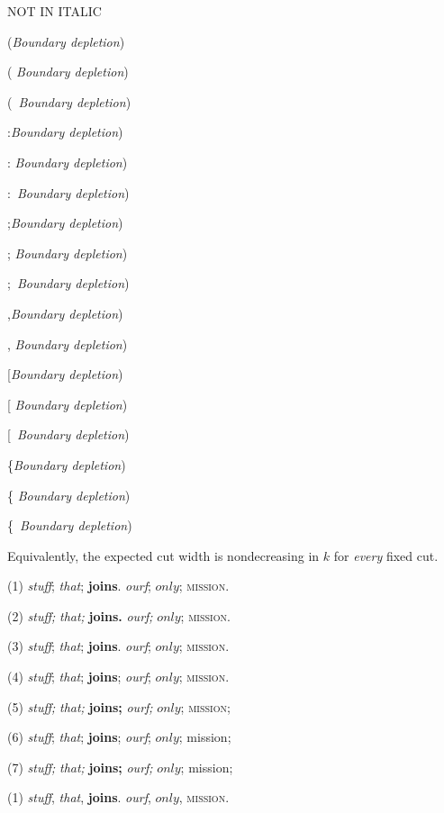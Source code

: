 \documentclass{amsart}
\begin{document}
    \vspace{24pt}

    \textsc{NOT IN ITALIC}

  (\emph{Boundary depletion})

  ( \emph{Boundary depletion})

  (\ \emph{Boundary depletion})    

  :\emph{Boundary depletion})
  
  : \emph{Boundary depletion})

  :\ \emph{Boundary depletion})    

  ;\emph{Boundary depletion})

  ; \emph{Boundary depletion})

  ;\ \emph{Boundary depletion})    

  ,\emph{Boundary depletion})

  , \emph{Boundary depletion})

  [\emph{Boundary depletion})

  [ \emph{Boundary depletion})

    [\ \emph{Boundary depletion})

      \{\emph{Boundary depletion})

      \{ \emph{Boundary depletion})

  \{\ \emph{Boundary depletion})                      

Equivalently, the expected cut width is nondecreasing in $k$ for \emph{every} fixed cut.

(1) \textit{stuff}; \emph{that}; \textbf{joins}. \textit{ourf}; $only$; \textsc{mission}.

(2) \textit{stuff;} \emph{that;} \textbf{joins.} \textit{ourf;} $only$; \textsc{mission.}

(3) \textit{stuff}\/; \emph{that}\/; \textbf{joins}\/. \textit{ourf}\/; $only$; \textsc{mission}\/.

(4) \textit{stuff}; \emph{that}; \textbf{joins}; \textit{ourf}; $only$; \textsc{mission}.

(5) \textit{stuff;} \emph{that;} \textbf{joins;} \textit{ourf;} $only$; \textsc{mission;}

(6) {\it stuff}; {\em that}; {\bf joins}; {\it ourf}; $only$; {\sc mission};

(7) {\it stuff;} {\em that;} {\bf joins;} {\it ourf;} $only$; {\sc mission;}

\vspace{12pt}

(1) \textit{stuff}, \emph{that}, \textbf{joins}. \textit{ourf}, $only$, \textsc{mission}.
\end{document}

